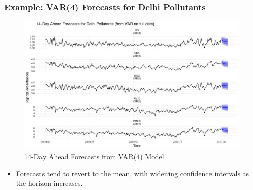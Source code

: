 \documentclass[svgnames, 12pt]{beamer}
\begin{document}
\begin{frame}
    \frametitle{Example: VAR(4) Forecasts for Delhi Pollutants}
    \begin{figure}
        \includegraphics[width=\linewidth]{../analysis/assets/var_forecast_delhi.png}
        \caption{14-Day Ahead Forecasts from VAR(4) Model.}
    \end{figure}
    \begin{itemize}
        \item \footnotesize Forecasts tend to revert to the mean, with widening confidence intervals as the horizon increases.
    \end{itemize}
\end{frame}

\end{document}
